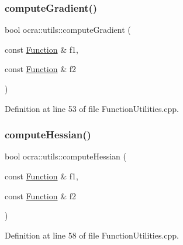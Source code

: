 \subsubsection{\texorpdfstring{compute\+Gradient()}{computeGradient()}}
{\footnotesize\ttfamily bool ocra\+::utils\+::compute\+Gradient (\begin{DoxyParamCaption}\item[{const \hyperlink{classocra_1_1Function}{Function} \&}]{f1,  }\item[{const \hyperlink{classocra_1_1Function}{Function} \&}]{f2 }\end{DoxyParamCaption})}



Definition at line 53 of file Function\+Utilities.\+cpp.

\hypertarget{namespaceocra_1_1utils_a3fba5c6f77b54b0eee4cdd49f7991957}{}\label{namespaceocra_1_1utils_a3fba5c6f77b54b0eee4cdd49f7991957} 
\subsubsection{\texorpdfstring{compute\+Hessian()}{computeHessian()}}
{\footnotesize\ttfamily bool ocra\+::utils\+::compute\+Hessian (\begin{DoxyParamCaption}\item[{const \hyperlink{classocra_1_1Function}{Function} \&}]{f1,  }\item[{const \hyperlink{classocra_1_1Function}{Function} \&}]{f2 }\end{DoxyParamCaption})}



Definition at line 58 of file Function\+Utilities.\+cpp.

\hypertarget{namespaceocra_1_1utils_a5d9dfa0a2dc2197c50ba35951f19586e}{}\label{namespaceocra_1_1utils_a5d9dfa0a2dc2197c50ba35951f19586e} 
